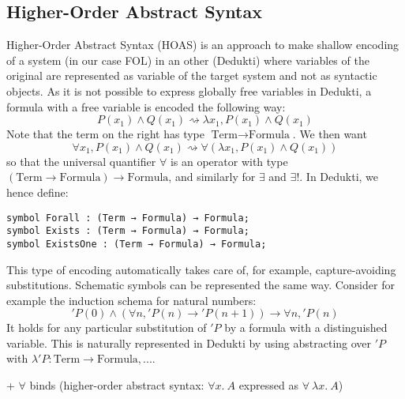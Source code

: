 \documentclass{article}
\newcommand{\Term}{\text{Term}}
\newcommand{\Formula}{\text{Formula}}
\begin{document}
	\subsection{Higher-Order Abstract Syntax}
	Higher-Order Abstract Syntax (HOAS) is an approach to make shallow encoding of a system (in our case FOL) in an other (Dedukti) where variables of the original are represented as variable of the target system and not as syntactic objects. As it is not possible to express globally free variables in Dedukti, a formula with a free variable is encoded the following way:
	$$
	P(x_1) \land Q(x_1) \rightsquigarrow \lambda x_1 ,  P(x_1) \land Q(x_1)
	$$
	Note that the term on the right has type $\Term \rightarrow \Formula$. We then want
	$$
	\forall x_1, P(x_1) \land Q(x_1) \rightsquigarrow \forall (\lambda x_1 ,  P(x_1) \land Q(x_1))
	$$
	so that the universal quantifier $\forall$ is an operator with type $(\Term \rightarrow \Formula) \rightarrow \Formula$, and similarly for $\exists$ and $\exists !$. In Dedukti, we hence define:
		\begin{lstlisting}[language=Dialekto]
symbol Forall : (Term → Formula) → Formula;
symbol Exists : (Term → Formula) → Formula;
symbol ExistsOne : (Term → Formula) → Formula;
\end{lstlisting}
This type of encoding automatically takes care of, for example, capture-avoiding substitutions. Schematic symbols can be represented the same way. Consider for example the induction schema for natural numbers:
$$
	'P(0) \land (\forall n, 'P(n) \rightarrow 'P(n+1)) \rightarrow \forall n, 'P(n)
$$
It holds for any particular substitution of $'P$ by a formula with a distinguished variable. This is naturally represented in Dedukti by using abstracting over $'P$ with $\lambda 'P: \Term\rightarrow\Formula, ...$.
	
	+ $\forall$ binds (higher-order abstract syntax: $\forall x.~A$ expressed as $\forall~\lambda x.~A$)
	
\end{document}
